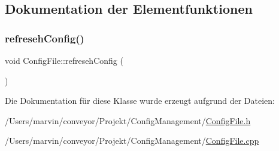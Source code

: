 \subsection{Dokumentation der Elementfunktionen}
\hypertarget{class_config_file_a48a2e1c781af3f0947c93d1d37e5b71a}{}\label{class_config_file_a48a2e1c781af3f0947c93d1d37e5b71a} 
\subsubsection{\texorpdfstring{refreseh\+Config()}{refresehConfig()}}
{\footnotesize\ttfamily void Config\+File\+::refreseh\+Config (\begin{DoxyParamCaption}{ }\end{DoxyParamCaption})}



Die Dokumentation für diese Klasse wurde erzeugt aufgrund der Dateien\+:\begin{DoxyCompactItemize}
\item 
/\+Users/marvin/conveyor/\+Projekt/\+Config\+Management/\hyperlink{_config_file_8h}{Config\+File.\+h}\item 
/\+Users/marvin/conveyor/\+Projekt/\+Config\+Management/\hyperlink{_config_file_8cpp}{Config\+File.\+cpp}\end{DoxyCompactItemize}
